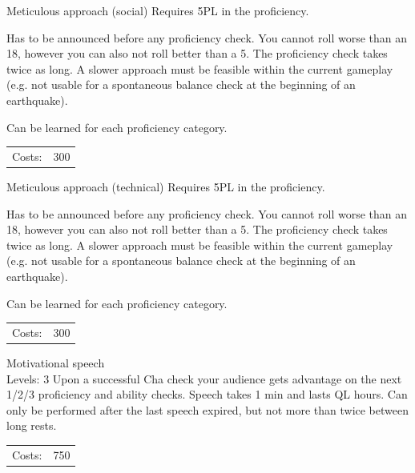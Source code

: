 \begin{skill}{Meticulous approach (social)}
	\setlength{\parskip}{8pt}
	\setlength{\parindent}{0pt}
	Requires 5PL in the proficiency.

	Has to be announced before any proficiency check. You cannot roll worse than an 18, however you can also not roll better than a 5. The proficiency check takes twice as long. A slower approach must be feasible within the current gameplay (e.g. not usable for a spontaneous balance check at the beginning of an earthquake).

	Can be learned for each proficiency category.\\

	\hfill
	\begin{tabular}{rr}
		Costs: & 300 \\
	\end{tabular}
\end{skill}

\begin{skill}{Meticulous approach (technical)}
	\setlength{\parskip}{8pt}
	\setlength{\parindent}{0pt}
	Requires 5PL in the proficiency.

	Has to be announced before any proficiency check. You cannot roll worse than an 18, however you can also not roll better than a 5. The proficiency check takes twice as long. A slower approach must be feasible within the current gameplay (e.g. not usable for a spontaneous balance check at the beginning of an earthquake).

	Can be learned for each proficiency category.\\

	\hfill
	\begin{tabular}{rr}
		Costs: & 300 \\
	\end{tabular}
\end{skill}

\begin{skill}{Motivational speech \\\phantom{a}\hfill Levels: 3}
	\setlength{\parskip}{8pt}
	\setlength{\parindent}{0pt}
	Upon a successful Cha check your audience gets advantage on the next 1/2/3 proficiency and ability checks. Speech takes 1 min and lasts QL hours. Can only be performed after the last speech expired, but not more than twice between long rests.\\

	\hfill
	\begin{tabular}{rr}
		Costs: & 750 \\
	\end{tabular}
\end{skill}

